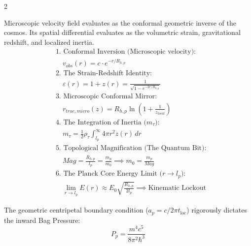 \documentclass[11pt, a4paper]{article}
\newcounter{cheatnum}
\begin{document}
\begin{multicols}{2}
\begin{tcolorbox}[cheatbox, title={\refstepcounter{cheatnum}\label{box:localized_metric_strain}\thecheatnum. Localized Metric (Conformal Duality) \scriptsize\hfill\hyperref[sec:deriv_localized_metric_strain]{[Proof $\downarrow$]}}]
Microscopic velocity field evaluates as the conformal geometric inverse of the cosmos. Its spatial differential evaluates as the volumetric strain, gravitational redshift, and localized inertia.
\begin{align}
    &\text{1. Conformal Inversion (Microscopic velocity):} \nonumber \\
    &\quad v_{obs}(r) = c \cdot e^{-r/R_{h,p}} \label{eq:vobs_conformal} \\
    &\text{2. The Strain-Redshift Identity:} \nonumber \\
    &\quad \varepsilon(r) = 1+z(r) = \frac{1}{\sqrt{1 - e^{-2r/R_{h,p}}}} \label{eq:strain_redshift_identity} \\
    &\text{3. Microscopic Conformal Mirror:} \nonumber \\
    &\quad r_{true, micro}(z) = R_{h,p} \ln\left( 1 + \frac{1}{z_{local}} \right) \label{eq:conformal_r} \\
    &\text{4. The Integration of Inertia ($m_\tau$):} \nonumber \\
    &\quad m_\tau = \frac{1}{2} \rho_{\tau} \int_{l_p}^\infty 4\pi r^2 z(r) \, dr \label{eq:mass_integral_redshift} \\
    &\text{5. Topological Magnification (The Quantum Bit):} \nonumber \\
    &\quad Mag = \frac{R_{h,p}}{l_p} = \frac{m_p}{m_0} \implies m_0 = \frac{m_p}{Mag} \label{eq:conformal_mag} \\
    &\text{6. The Planck Core Energy Limit ($r \to l_p$):} \nonumber \\
    &\quad \lim_{r \to l_p} E(r) \approx E_0 \sqrt{\frac{R_{h,p}}{2l_p}} \implies \text{Kinematic Lockout} \label{eq:planck_core_energy_limit}
\end{align}
\end{tcolorbox}

\begin{tcolorbox}[cheatbox, title={\refstepcounter{cheatnum}\label{box:bag_pressure}\thecheatnum. Confinement Pressure \& Work \scriptsize\hfill\hyperref[sec:deriv_bag_pressure]{[Proof $\downarrow$]}}]
The geometric centripetal boundary condition ($a_p = c/2\pi t_{\text{loc}}$) rigorously dictates the inward Bag Pressure:
\begin{equation}\label{eq:pp}
    P_p = \frac{m^4 c^5}{8\pi^2 \hbar^3} 
\end{equation}


\end{tcolorbox}
\end{multicols}
\end{document}
